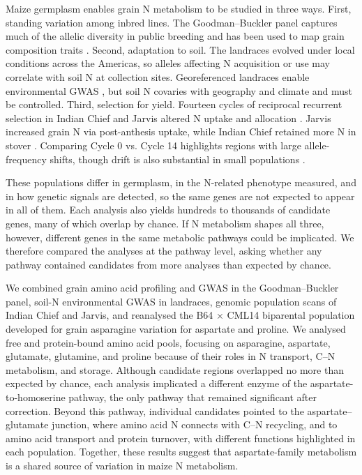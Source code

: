 Maize germplasm enables grain N metabolism to be studied in three ways. First, standing variation among inbred lines. The Goodman--Buckler panel captures much of the allelic diversity in public breeding and has been used to map grain composition traits \citep{FlintGarcia2005Goodman,Shrestha2022}. Second, adaptation to soil. The landraces evolved under local conditions across the Americas, so alleles affecting N acquisition or use may correlate with soil N at collection sites. Georeferenced landraces enable environmental GWAS \citep{RomeroNavarro2017Landraces}, but soil N covaries with geography and climate and must be controlled. Third, selection for yield. Fourteen cycles of reciprocal recurrent selection in Indian Chief and Jarvis altered N uptake and allocation \citep{Comstock1949RRS,MollStuber1971}. Jarvis increased grain N via post-anthesis uptake, while Indian Chief retained more N in stover \citep{Moll1994}. Comparing Cycle 0 vs. Cycle 14 highlights regions with large allele-frequency shifts, though drift is also substantial in small populations \citep{Gerke2015DriftRRS}.

These populations differ in germplasm, in the N-related phenotype measured, and in how genetic signals are detected, so the same genes are not expected to appear in all of them. Each analysis also yields hundreds to thousands of candidate genes, many of which overlap by chance. If N metabolism shapes all three, however, different genes in the same metabolic pathways could be implicated. We therefore compared the analyses at the pathway level, asking whether any pathway contained candidates from more analyses than expected by chance.

We combined grain amino acid profiling and GWAS in the Goodman--Buckler panel, soil-N environmental GWAS in landraces, genomic population scans of Indian Chief and Jarvis, and reanalysed the B64 $\times$ CML14 biparental population developed for grain asparagine variation for aspartate and proline. We analysed free and protein-bound amino acid pools, focusing on asparagine, aspartate, glutamate, glutamine, and proline because of their roles in N transport, C--N metabolism, and storage. Although candidate regions overlapped no more than expected by chance, each analysis implicated a different enzyme of the aspartate-to-homoserine pathway, the only pathway that remained significant after correction. Beyond this pathway, individual candidates pointed to the aspartate--glutamate junction, where amino acid N connects with C--N recycling, and to amino acid transport and protein turnover, with different functions highlighted in each population. Together, these results suggest that aspartate-family metabolism is a shared source of variation in maize N metabolism.

